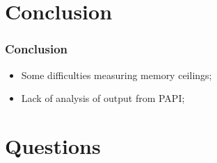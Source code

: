 \documentclass{beamer}
\begin{document}
\section{Conclusion}
\begin{frame}
	\frametitle{Conclusion}
	\begin{itemize}
		\item Some difficulties measuring memory ceilings;
		\item Lack of analysis of output from PAPI;
	\end{itemize}
\end{frame}

\section{Questions}
\begin{frame}
	\titlepage
	
	
\end{frame}
\end{document}

